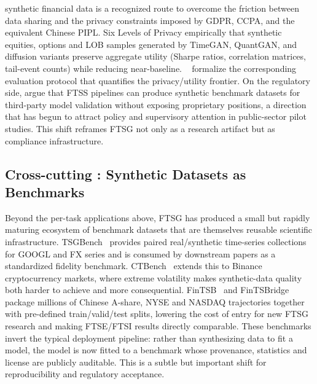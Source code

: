 synthetic financial data is a recognized route to overcome the friction
between data sharing and the privacy constraints imposed by GDPR, CCPA,
and the equivalent Chinese PIPL. Six Levels of
Privacy empirically that synthetic equities, options and LOB
samples generated by TimeGAN, QuantGAN, and diffusion variants preserve
aggregate utility (Sharpe ratios, correlation matrices, tail-event
counts) while reducing near-baseline. ~\citep{boudewijn2023privacy} formalize the corresponding
evaluation protocol that quantifies the privacy/utility frontier. On
the regulatory side, \citep{balch2024six} argue that FTSS pipelines can
produce synthetic benchmark datasets for third-party model validation
without exposing proprietary positions, a direction that has begun to
attract policy and supervisory attention in public-sector pilot studies.
This shift reframes FTSG not only as a research artifact but as
compliance infrastructure.

\subsection{Cross-cutting : Synthetic Datasets as Benchmarks}

Beyond the per-task applications above, FTSG has produced a small but
rapidly maturing ecosystem of benchmark datasets that are themselves
reusable scientific infrastructure. TSGBench~\citep{ang2023tsgbench}
provides paired real/synthetic time-series collections for GOOGL and FX
series and is consumed by downstream papers as a standardized fidelity
benchmark. CTBench~\citep{ang2025ctbench} extends this to Binance
cryptocurrency markets, where extreme volatility makes synthetic-data
quality both harder to achieve and more consequential.
FinTSB~\citep{hu2025fintsb} and FinTSBridge~\citep{wang2025fintsbridge}
package millions of Chinese A-share, NYSE and NASDAQ trajectories
together with pre-defined train/valid/test splits, lowering the cost of
entry for new FTSG research and making FTSE/FTSI results directly
comparable. These benchmarks invert the typical deployment pipeline:
rather than synthesizing data to fit a model, the model is now fitted
to a benchmark whose provenance, statistics and license are publicly
auditable. This is a subtle but important shift for reproducibility and
regulatory acceptance.

